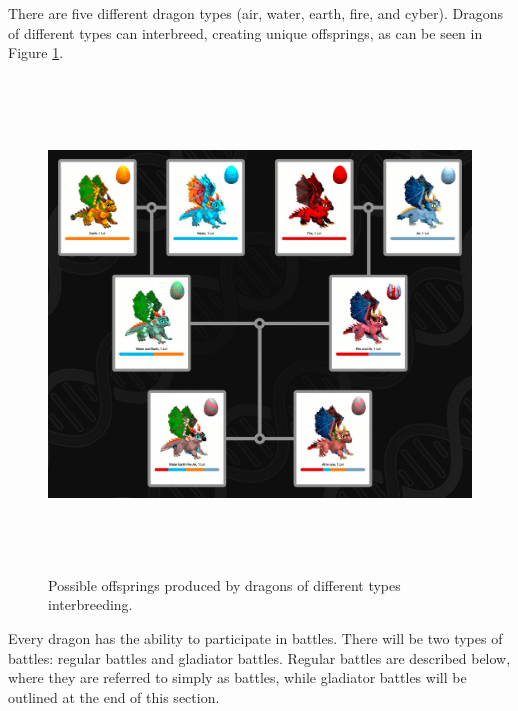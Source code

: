 \documentclass[12pt]{article}
\begin{document}
There are five different dragon types (air, water, earth, fire, and cyber). Dragons of different types can interbreed, creating unique offsprings, as can be seen in Figure \ref{fig:Possible_offsprings_produced_by_dragons_of_different_types_interbreeding}.\par



\begin{Center}
\begin{figure}[!ht]
	\begin{Center}		\includegraphics[width=6.27in,height=5.15in]{./media/image16.png}
		\caption{Possible offsprings produced by dragons of different types interbreeding.}
		\label{fig:Possible_offsprings_produced_by_dragons_of_different_types_interbreeding}
	\end{Center}\end{figure}
\end{Center}





Every dragon has the ability to participate in battles. There will be two types of battles: regular battles and gladiator battles. Regular battles are described below, where they are referred to simply as battles, while gladiator battles will be outlined at the end of this section.\par
\end{document}

